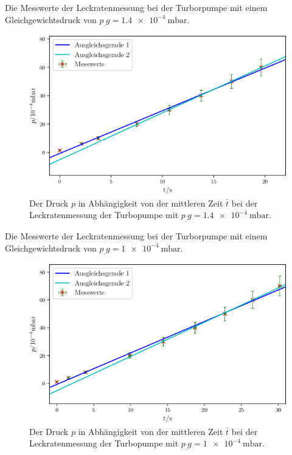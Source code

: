\begin{table}
\centering
\caption{Die Messwerte der Leckratenmessung bei der Turborpumpe mit einem Gleichgewichtsdruck von $p_.g = \SI{1.4e-4}{\milli\bar}$.}

\label{tab:TL2}
\end{table}

\begin{figure}
\centering
\includegraphics[width=\linewidth-70pt,height=\textheight-70pt,keepaspectratio]{content/images/TL2.png}
\caption{Der Druck $p$ in Abhängigkeit von der mittleren Zeit $\bar{t}$ bei der Leckratenmessung der Turbopumpe  mit $p_.g = \SI{1.4e-4}{\milli\bar}$.}
\label{fig:TL2}
\end{figure}

\begin{table}
\centering
\caption{Die Messwerte der Leckratenmessung bei der Turborpumpe mit einem Gleichgewichtsdruck von $p_.g = \SI{1e-4}{\milli\bar}$.}

\label{tab:TL3}
\end{table}

\begin{figure}
\centering
\includegraphics[width=\linewidth-70pt,height=\textheight-70pt,keepaspectratio]{content/images/TL3.png}
\caption{Der Druck $p$ in Abhängigkeit von der mittleren Zeit $\bar{t}$ bei der Leckratenmessung der Turbopumpe  mit $p_.g = \SI{1e-4}{\milli\bar}$.}
\label{fig:TL3}
\end{figure}

